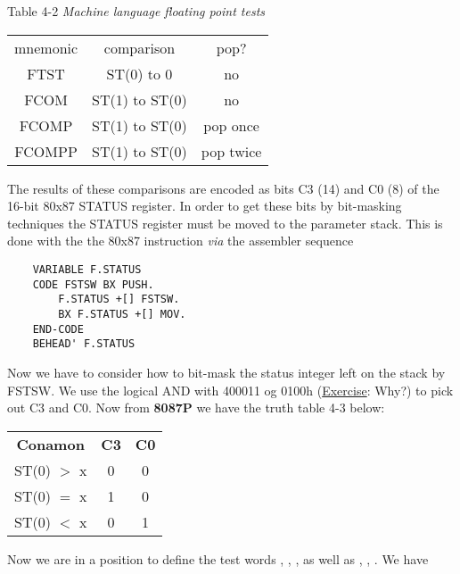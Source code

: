 Table 4-2 \textit{Machine language floating point tests}
\begin{center}
    \begin{tabular}{|c c c|}
        \hline
        mnemonic    &   comparison      &   pop?        \\
        FTST        &   ST(0) to 0      &   no          \\
        FCOM        &   ST(1) to ST(0)  &   no          \\
        FCOMP       &   ST(1) to ST(0)  &   pop once    \\
        FCOMPP      &   ST(1) to ST(0)  &   pop twice   \\
        \hline
    \end{tabular}
\end{center}

The results of these comparisons are encoded as bits C3 (14) and C0 (8) of the 16-bit 80x87 STATUS register. In order to get these bits by bit-masking techniques the STATUS register must be moved to the parameter stack. This is done with the the 80x87 instruction  \textit{via} the assembler sequence

\begin{lstlisting}
    VARIABLE F.STATUS
    CODE FSTSW BX PUSH.
        F.STATUS +[] FSTSW.
        BX F.STATUS +[] MOV.
    END-CODE
    BEHEAD' F.STATUS
\end{lstlisting}

Now we have to consider how to bit-mask the status integer left on the stack by FSTSW. We use the logical AND with 400011 og 0100h (\underline{Exercise}: Why?) to pick out C3 and C0. Now from \textbf{8087P} we have the truth table 4-3 below:

\begin{center}
    \begin{tabular}{|c c c|}
        \hline
        \textbf{Conamon}    &   \textbf{C3} & \textbf{C0} \\
        ST(0) $>$ x           &   0           & 0         \\
        ST(0) $=$ x           &   1           & 0         \\
        ST(0) $<$ x           &   0           & 1         \\
        \hline
    \end{tabular}
\end{center}

Now we are in a position to define the test words , ,
, as well as , , . We have

